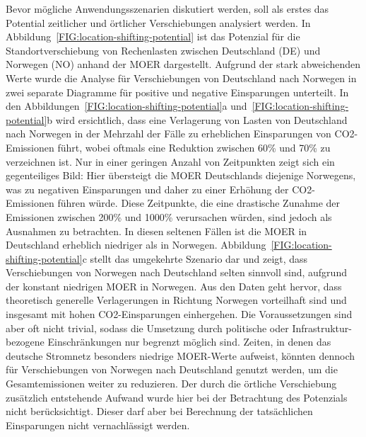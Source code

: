Bevor mögliche Anwendungsszenarien diskutiert werden, soll als erstes das Potential zeitlicher und örtlicher Verschiebungen analysiert werden.
In Abbildung~\ref{FIG:location-shifting-potential} ist das Potenzial für die Standortverschiebung von Rechenlasten zwischen Deutschland (DE) und Norwegen (NO) anhand der \ac{MOER} dargestellt.
Aufgrund der stark abweichenden Werte wurde die Analyse für Verschiebungen von Deutschland nach Norwegen in zwei separate Diagramme für positive und negative Einsparungen unterteilt.
In den Abbildungen~\ref{FIG:location-shifting-potential}a und~\ref{FIG:location-shifting-potential}b wird ersichtlich, dass eine Verlagerung von Lasten von Deutschland nach Norwegen in der Mehrzahl der Fälle zu erheblichen Einsparungen von CO2-Emissionen führt, wobei oftmals eine Reduktion zwischen 60\% und 70\% zu verzeichnen ist.
Nur in einer geringen Anzahl von Zeitpunkten zeigt sich ein gegenteiliges Bild:
Hier übersteigt die \ac{MOER} Deutschlands diejenige Norwegens, was zu negativen Einsparungen und daher zu einer Erhöhung der CO2-Emissionen führen würde.
Diese Zeitpunkte, die eine drastische Zunahme der Emissionen zwischen 200\% und 1000\% verursachen würden, sind jedoch als Ausnahmen zu betrachten.
In diesen seltenen Fällen ist die \ac{MOER} in Deutschland erheblich niedriger als in Norwegen.
Abbildung~\ref{FIG:location-shifting-potential}c stellt das umgekehrte Szenario dar und zeigt, dass Verschiebungen von Norwegen nach Deutschland selten sinnvoll sind, aufgrund der konstant niedrigen \ac{MOER} in Norwegen.
Aus den Daten geht hervor, dass theoretisch generelle Verlagerungen in Richtung Norwegen vorteilhaft sind und insgesamt mit hohen CO2-Einsparungen einhergehen.
Die Voraussetzungen sind aber oft nicht trivial, sodass die Umsetzung durch politische oder Infrastruktur-bezogene Einschränkungen nur begrenzt möglich sind.
Zeiten, in denen das deutsche Stromnetz besonders niedrige \ac{MOER}-Werte aufweist, könnten dennoch für Verschiebungen von Norwegen nach Deutschland genutzt werden, um die Gesamtemissionen weiter zu reduzieren.
Der durch die örtliche Verschiebung zusätzlich entstehende Aufwand wurde hier bei der Betrachtung des Potenzials nicht berücksichtigt.
Dieser darf aber bei Berechnung der tatsächlichen Einsparungen nicht vernachlässigt werden.

